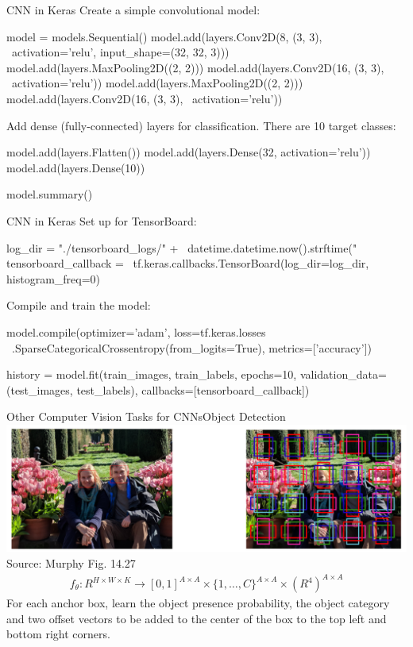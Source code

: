 \documentclass[ignorenonframetext,xcolor=x11names]{beamer}
\begin{document}
\begin{frame}[fragile]{CNN in Keras}
Create a simple convolutional model:
\begin{pythoncode}
model = models.Sequential()
model.add(layers.Conv2D(8, (3, 3), \ 
    activation='relu', input_shape=(32, 32, 3)))
model.add(layers.MaxPooling2D((2, 2)))
model.add(layers.Conv2D(16, (3, 3), \ 
    activation='relu'))
model.add(layers.MaxPooling2D((2, 2)))
model.add(layers.Conv2D(16, (3, 3), \
    activation='relu'))
\end{pythoncode}
Add dense (fully-connected) layers for classification. There are 10 target classes:
\begin{pythoncode}
model.add(layers.Flatten())
model.add(layers.Dense(32, activation='relu'))
model.add(layers.Dense(10))

model.summary()
\end{pythoncode}
\end{frame}

\begin{frame}[fragile]{CNN in Keras}
Set up for TensorBoard:
\begin{pythoncode}
log_dir = "./tensorboard_logs/" + \
    datetime.datetime.now().strftime("%
tensorboard_callback = \
    tf.keras.callbacks.TensorBoard(log_dir=log_dir, 
        histogram_freq=0)
\end{pythoncode}
Compile and train the model:
\begin{pythoncode}
model.compile(optimizer='adam',
    loss=tf.keras.losses \
        .SparseCategoricalCrossentropy(from_logits=True),
    metrics=['accuracy'])

history = model.fit(train_images, train_labels, 
    epochs=10, 
    validation_data=(test_images, test_labels),
    callbacks=[tensorboard_callback])
\end{pythoncode}
\end{frame}

\begin{frame}{Other Computer Vision Tasks for CNNs}{Object Detection}
\includegraphics[width=\textwidth]{screen10.png} \\

\scriptsize Source: Murphy Fig. 14.27
\normalsize
\begin{align*}
f_\theta: R^{H\times W \times K} \rightarrow [0,1]^{A \times A} \times \{1, \ldots, C\}^{A \times A} \times (R^4)^{A \times A}
\end{align*}
For each anchor box, learn the object presence probability, the object category and two offset vectors to be added to the center of the box to the top left and bottom right corners.
\end{frame}
\end{document}
